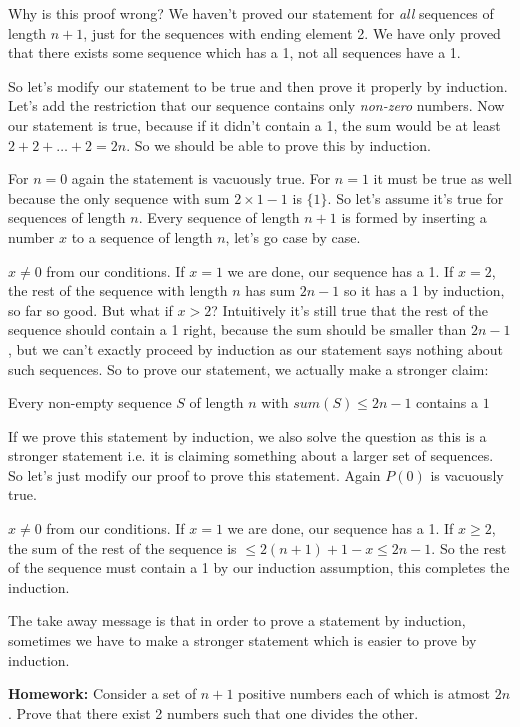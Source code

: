 \documentclass[a4paper,10pt]{article}
\theoremstyle{definition} %
\begin{document}
    Why is this proof wrong? We haven't proved our statement for \emph{all} sequences of length
    $n+1$, just for the sequences with ending element 2. We have only proved that there exists
    some sequence which has a 1, not all sequences have a 1.

    So let's modify our statement to be true and then prove it properly by induction. Let's
    add the restriction that our sequence contains only \emph{non-zero} numbers. Now
    our statement is true, because if it didn't contain a 1, the sum would be at least
    $2 + 2 + \dots + 2 = 2n$. So we should be able to prove this by induction.
    
    For $n = 0$ again the statement is vacuously true. For $n = 1$ it must be true as 
    well because the only sequence with sum $2\times1-1$ is $\{1\}$. So let's assume 
    it's true for sequences of length $n$. Every sequence of length $n+1$ is formed by 
    inserting a number $x$ to a sequence of length $n$, let's go case by case.

    $x \neq 0$ from our conditions. If $x = 1$ we are done, our sequence has a 1. If
    $x = 2$, the rest of the sequence with length $n$ has sum $2n-1$ so it has a 1 by
    induction, so far so good. But what if $x > 2$? Intuitively it's still true that 
    the rest of the sequence should contain a 1 right, because the sum should be smaller 
    than $2n-1$, but we can't exactly proceed by induction as our statement says nothing 
    about such sequences. So to prove our statement, we actually make a stronger claim:

    Every non-empty sequence $S$ of length $n$ with $sum(S) \leq 2n-1$ contains a $1$
    
    If we prove this statement by induction, we also solve the question as this is a 
    stronger statement i.e. it is claiming something about a larger set of sequences. 
    So let's just modify our proof to prove this statement. Again $P(0)$ is vacuously true.

    $x \neq 0$ from our conditions. If $x = 1$ we are done, our sequence has a 1.
    If $x \geq 2$, the sum of the rest of the sequence is $\leq 2(n+1)+1-x \leq 2n-1$.
    So the rest of the sequence must contain a 1 by our induction assumption, this completes
    the induction.

    The take away message is that in order to prove a statement by induction, sometimes 
    we have to make a stronger statement which is easier to prove by induction.

    \textbf{Homework: }Consider a set of $n+1$ positive numbers each of which is atmost
    $2n$. Prove that there exist 2 numbers such that one divides the other.
\end{document}

